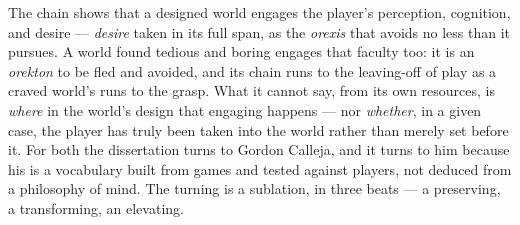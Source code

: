 \documentclass{article}
\begin{document}
The chain shows that a designed world engages the player's perception, cognition, and desire — \textit{desire} taken in its full span, as the \textit{orexis} that avoids no less than it pursues. A world found tedious and boring engages that faculty too: it is an \textit{orekton} to be fled and avoided, and its chain runs to the leaving-off of play as a craved world's runs to the grasp. What it cannot say, from its own resources, is \textit{where} in the world's design that engaging happens — nor \textit{whether}, in a given case, the player has truly been taken into the world rather than merely set before it. For both the dissertation turns to Gordon Calleja, and it turns to him because his is a vocabulary built from games and tested against players, not deduced from a philosophy of mind. The turning is a sublation, in three beats — a preserving, a transforming, an elevating.
\end{document}
